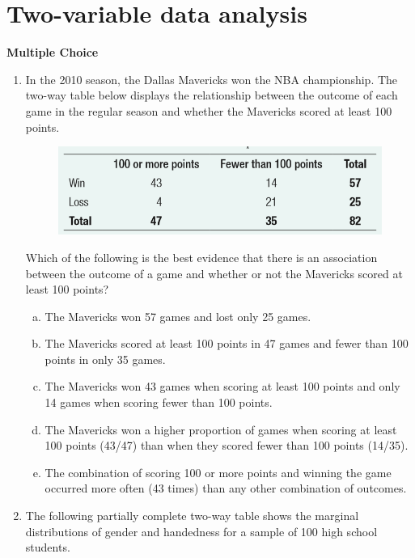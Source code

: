 \documentclass[a4paper,12pt,twoside]{book}
\begin{document}
\chapter{Two-variable data analysis}
\newpage

\textbf{Multiple Choice}

    \begin{enumerate}   
    \item In the 2010 season, the Dallas Mavericks won the NBA championship. The two-way table below displays the relationship between the outcome of each game in the regular season and whether the Mavericks scored at least 100 points. 
        \begin{figure}[H]
            \centering
            \includegraphics[scale=0.6]{figure0201}
        \end{figure}
    Which of the following is the best evidence that there is an association between the outcome of a game and whether or not the Mavericks scored at least 100 points?
    
        \begin{enumerate}[(a)]
            \item The Mavericks won 57 games and lost only 25 games.
            \item The Mavericks scored at least 100 points in 47 games and fewer than 100 points in only 35 games.
            \item The Mavericks won 43 games when scoring at least 100 points and only 14 games when scoring fewer than 100 points. 
            \item The Mavericks won a higher proportion of games when scoring at least 100 points (43/47) than when they scored fewer than 100 points (14/35).
            \item The combination of scoring 100 or more points and winning the game occurred more often (43 times) than any other combination of outcomes.
        \end{enumerate}
        \vspace{0.3cm}
        
    \item The following partially complete two-way table shows the marginal distributions of gender and handedness for a sample of 100 high school students.
    

\end{enumerate}
\end{document}
